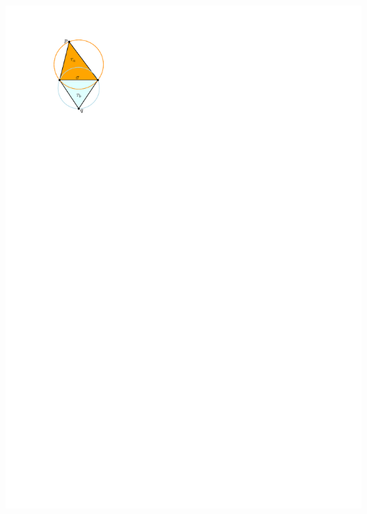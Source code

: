 \begin{marginfigure}
  \centering
  \includegraphics[width=\textwidth,page=1]{local}

\end{marginfigure}

